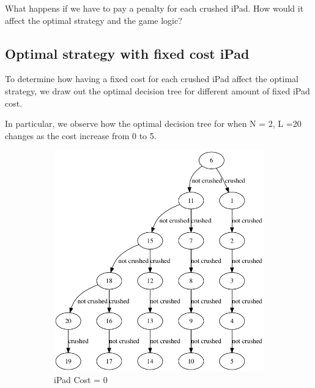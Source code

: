 \documentclass[12pt,a4paper,oneside]{report}
\begin{document}
What happens if we have to pay a penalty for each crushed iPad. How would it affect the optimal strategy and the game logic?

\subsection{Optimal strategy with fixed cost iPad}

To determine how having a fixed cost for each crushed iPad affect the optimal strategy, we draw out the optimal decision tree for different amount of fixed iPad cost.

In particular, we observe how the optimal decision tree for when N = 2, L =20 changes as the cost increase from 0 to 5.

\begin{figure}[H]
	\begin{subfigure}{0.3\textwidth}
		\includegraphics[width=\textwidth]{fixed_cost_0}
		\caption{iPad Cost = 0}
		\label{fig:fixed_cost_0}
	\end{subfigure}
	\begin{subfigure}{0.3\textwidth}

\end{subfigure}
\end{figure}
\end{document}
